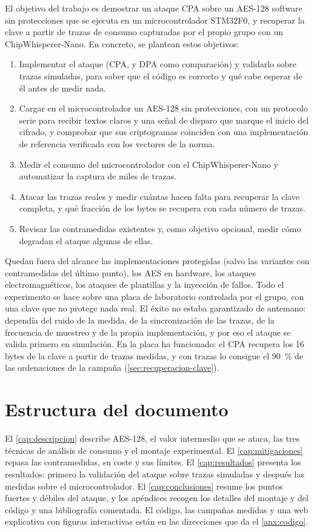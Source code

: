 El objetivo del trabajo es demostrar un ataque CPA sobre un AES-128 software sin
protecciones que se ejecuta en un microcontrolador STM32F0, y recuperar la
clave a partir de trazas de consumo capturadas por el propio grupo con un
ChipWhisperer-Nano. En concreto, se plantean estos objetivos:

\begin{enumerate}
  \item Implementar el ataque (CPA, y DPA como comparación) y validarlo sobre
    trazas simuladas, para saber que el código es correcto y qué cabe esperar
    de él antes de medir nada.
  \item Cargar en el microcontrolador un AES-128 sin protecciones, con un
    protocolo serie para recibir textos claros y una señal de disparo que
    marque el inicio del cifrado, y comprobar que sus criptogramas coinciden con
    una implementación de referencia verificada con los vectores de la norma.
  \item Medir el consumo del microcontrolador con el ChipWhisperer-Nano y
    automatizar la captura de miles de trazas.
  \item Atacar las trazas reales y medir cuántas hacen falta para recuperar la
    clave completa, y qué fracción de los bytes se recupera con cada número de
    trazas.
  \item Revisar las contramedidas existentes y, como objetivo opcional, medir
    cómo degradan el ataque algunas de ellas.
\end{enumerate}

Quedan fuera del alcance las implementaciones protegidas (salvo las variantes
con contramedidas del último punto), los AES en hardware, los ataques electromagnéticos,
los ataques de plantillas y la inyección de fallos. Todo el experimento se hace
sobre una placa de laboratorio controlada por el grupo, con una clave que no
protege nada real. El éxito no estaba garantizado de antemano: dependía del
ruido de la medida, de la sincronización de las trazas, de la frecuencia de
muestreo y de la propia implementación, y por eso el ataque se valida primero
en simulación. En la placa ha funcionado: el CPA recupera los 16 bytes de la
clave a partir de trazas medidas, y con \realTracesNinety{} trazas lo consigue
el 90~\% de las ordenaciones de la campaña (\cref{sec:recuperacion-clave}).

\section{Estructura del documento}
\label{sec:estructura}

El \cref{cap:descripcion} describe AES-128, el valor intermedio que se ataca, las
tres técnicas de análisis de consumo y el montaje experimental. El
\cref{cap:mitigaciones} repasa las contramedidas, su coste y sus límites. El
\cref{cap:resultados} presenta los resultados: primero la validación del ataque
sobre trazas simuladas y después las medidas sobre el microcontrolador. El
\cref{cap:conclusiones} resume los puntos fuertes y débiles del ataque, y los
apéndices recogen los detalles del montaje y del código y una bibliografía
comentada. El código, las campañas medidas y una web explicativa con figuras
interactivas están en las direcciones que da el \cref{anx:codigo}.
